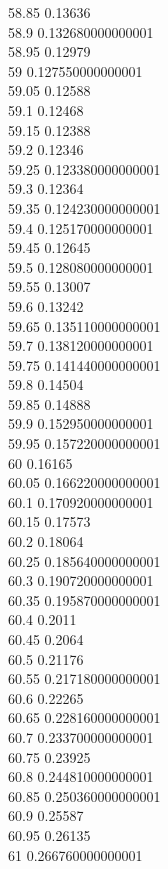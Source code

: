 {58.85	0.13636\\
58.9	0.132680000000001\\
58.95	0.12979\\
59	0.127550000000001\\
59.05	0.12588\\
59.1	0.12468\\
59.15	0.12388\\
59.2	0.12346\\
59.25	0.123380000000001\\
59.3	0.12364\\
59.35	0.124230000000001\\
59.4	0.125170000000001\\
59.45	0.12645\\
59.5	0.128080000000001\\
59.55	0.13007\\
59.6	0.13242\\
59.65	0.135110000000001\\
59.7	0.138120000000001\\
59.75	0.141440000000001\\
59.8	0.14504\\
59.85	0.14888\\
59.9	0.152950000000001\\
59.95	0.157220000000001\\
60	0.16165\\
60.05	0.166220000000001\\
60.1	0.170920000000001\\
60.15	0.17573\\
60.2	0.18064\\
60.25	0.185640000000001\\
60.3	0.190720000000001\\
60.35	0.195870000000001\\
60.4	0.2011\\
60.45	0.2064\\
60.5	0.21176\\
60.55	0.217180000000001\\
60.6	0.22265\\
60.65	0.228160000000001\\
60.7	0.233700000000001\\
60.75	0.23925\\
60.8	0.244810000000001\\
60.85	0.250360000000001\\
60.9	0.25587\\
60.95	0.26135\\
61	0.266760000000001\\
}
